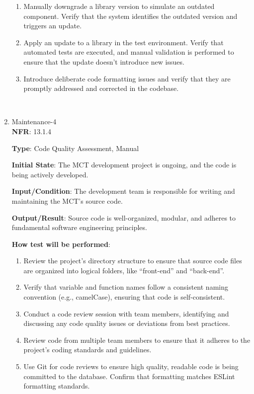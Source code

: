 \documentclass[12pt, titlepage]{article}
\begin{document}
\begin{enumerate}
\begin{enumerate}
    \item Manually downgrade a library version to simulate an outdated component. Verify that the system identifies the outdated version and triggers an update.

    \item Apply an update to a library in the test environment. Verify that automated tests are executed, and manual validation is performed to ensure that the update doesn't introduce new issues.

    \item Introduce deliberate code formatting issues and verify that they are promptly addressed and corrected in the codebase.
\end{enumerate}
\\
 
    \item {Maintenance-4\\}
\textbf{NFR}: 13.1.4

\textbf{Type}: Code Quality Assessment, Manual

\textbf{Initial State}: The MCT development project is ongoing, and the code is being actively developed.

\textbf{Input/Condition}: The development team is responsible for writing and maintaining the MCT's source code.

\textbf{Output/Result}: Source code is well-organized, modular, and adheres to fundamental software engineering principles.

\textbf{How test will be performed}: 
\begin{enumerate}
    \item Review the project's directory structure to ensure that source code files are organized into logical folders, like “front-end” and “back-end”.
    \item Verify that variable and function names follow a consistent naming convention (e.g., camelCase), ensuring that code is self-consistent.
    \item Conduct a code review session with team members, identifying and discussing any code quality issues or deviations from best practices.
    \item Review code from multiple team members to ensure that it adheres to the project's coding standards and guidelines.
    \item Use Git for code reviews to ensure high quality, readable code is being committed to the database. Confirm that formatting matches ESLint formatting standards.
\end{enumerate}\\


\end{enumerate}
\end{document}
